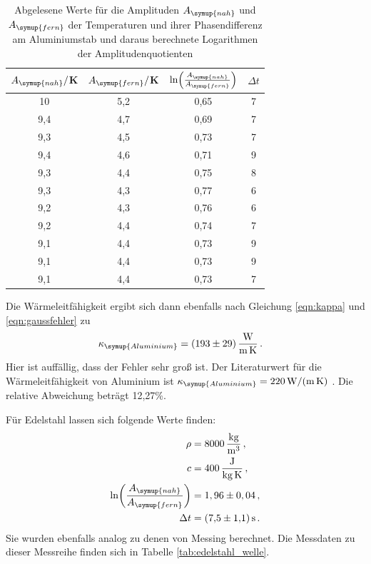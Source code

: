 \begin{table}
  \centering
  \caption{Abgelesene Werte für die Amplituden $A_{\symup{nah}}$ und $A_{\symup{fern}}$ der Temperaturen und
  ihrer Phasendifferenz am Aluminiumstab und daraus berechnete Logarithmen der Amplitudenquotienten}
  \label{tab:aluminium_welle}
  \begin{tabular}{c c c c}
    \toprule
     $A_{\symup{nah}}/$K  & $A_{\symup{fern}}/$K & $\ln\Bigl(\frac{A_{\symup{nah}}}{A_{\symup{fern}}}\Bigr)$ & $\Delta t$ \\
    \midrule
    10  	& 5,2  &  0,65 &  7 \\
    9,4	  & 4,7	 &  0,69 &  7 \\
    9,3	  & 4,5	 &  0,73 &  7 \\
    9,4	  & 4,6	 &  0,71 &  9 \\
    9,3	  & 4,4	 &  0,75 &  8 \\
    9,3	  & 4,3	 &  0,77 &  6 \\
    9,2	  & 4,3	 &  0,76 &  6 \\
    9,2	  & 4,4	 &  0,74 &  7 \\
    9,1	  & 4,4	 &  0,73 &  9 \\
    9,1	  & 4,4	 &  0,73 &  9 \\
    9,1	  & 4,4	 &  0,73 &  7 \\
    \bottomrule
  \end{tabular}
\end{table}
Die Wärmeleitfähigkeit ergibt sich dann ebenfalls nach Gleichung \eqref{eqn:kappa}
und \eqref{eqn:gaussfehler} zu
\begin{align}
  \kappa_{\symup{Aluminium}} &= \SI{193(29)}{\watt\per\meter\per\kelvin}\,.\nonumber
\end{align}
Hier ist auffällig, dass der Fehler sehr groß ist.
Der Literaturwert für die Wärmeleitfähigkeit von Aluminium ist
$\kappa_{\symup{Aluminium}} = \SI{220}{\watt\per\meter\per\kelvin}$ \cite{Wärmeleitfähigkeit1}. Die relative
Abweichung beträgt 12,27\%.


Für Edelstahl lassen sich folgende Werte finden:
\begin{align}
  \rho &= \SI{8000}{\kilo\gram\per\cubic\meter}\,, \nonumber\\
  c &= \SI{400}{\joule\per\kilo\gram\per\kelvin}\,, \nonumber\\
  \ln\biggl(\frac{A_{\symup{nah}}}{A_{\symup{fern}}}\biggr) &= 1,96\pm 0,04 \,, \nonumber\\
  \Delta t &= \SI{7.5(11)}{\second} \,.\nonumber
\end{align}
Sie wurden ebenfalls analog zu denen von Messing berechnet. Die Messdaten zu dieser Messreihe
finden sich in Tabelle \ref{tab:edelstahl_welle}.

